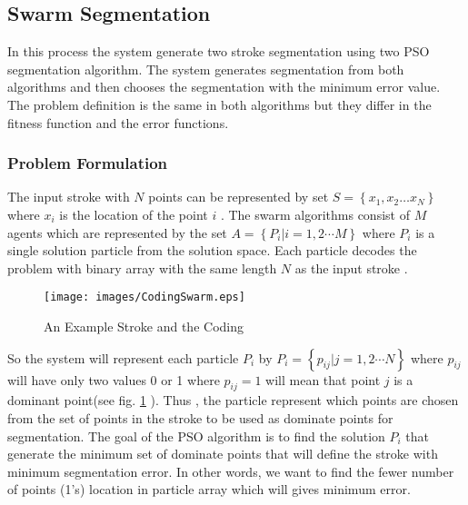 \subsection{Swarm Segmentation}
\label{sec:SwarmSegmentation}

In this process the system generate two stroke segmentation using two PSO segmentation algorithm. The system generates segmentation from both algorithms and then chooses the segmentation with the minimum error value. The problem definition is the same in both algorithms but they differ in the fitness function and the error functions. %
\subsubsection{Problem Formulation}
\label{sec:ProblemFormulation}
The input stroke with $N$ points can be represented by set $S = \left\{ {x_1 ,x_2  \ldots x_N } \right\}$ where $x_i$ is the location of the point $i$ . The swarm algorithms consist of $M$ agents which are represented by the set 
$A  = \left\{ {P_i \left| {i = 1,2 \cdots M} \right.} \right\}$ where $P_i$ is a single solution particle from the solution space. Each particle decodes the problem with binary array with the same length $N$ as the input stroke .  
\begin{figure}
	\centering
		\texttt{[image: images/CodingSwarm.eps]}
	\caption{An Example Stroke and the Coding}
	\label{fig:CodingSwarm}
\end{figure}

So the system will represent each particle $P_i$ by $P_i = \left\{ {p_{ij} \left| {j = 1,2 \cdots N} \right.} \right\}$ where $p_{ij}$ will have only two values 0 or 1 where $p_{ij}=1$ will mean that point $j$ is a dominant point(see fig. \ref{fig:CodingSwarm} ).  Thus , the particle represent which points are chosen from the set of points in the stroke to be used as dominate points for segmentation. 
The goal of the PSO algorithm is to find the solution $P_i$ that generate the minimum set of dominate points that will define the stroke with minimum segmentation error. In other words, we want to find the fewer number of points (1's) location in particle array which will gives minimum error.  


